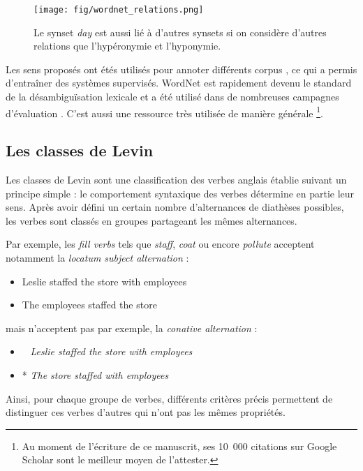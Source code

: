 \begin{figure}[t]
    \centering
    \texttt{[image: fig/wordnet\_relations.png]}
    \caption{\label{fig:wordnet_relations} Le synset \emph{day} est aussi lié à
        d'autres synsets si on considère d'autres relations que l'hypéronymie et
        l'hyponymie.}
\end{figure}

Les sens proposés ont étés utilisés pour annoter différents corpus
\citep{petrolito2014survey}, ce qui a permis d'entraîner des systèmes
supervisés. WordNet est rapidement devenu le standard de la désambiguïsation
lexicale et a été utilisé dans de nombreuses campagnes d'évaluation
\citep{navigli2009word}. C'est aussi une ressource très utilisée de manière
générale \footnote{Au moment de l'écriture de ce manuscrit, ses 10~000
    citations sur Google Scholar sont le meilleur moyen de l'attester.}.

\subsection{Les classes de Levin}

Les classes de Levin \citep{levin1993english} sont une classification des
verbes anglais établie suivant un principe simple : le comportement syntaxique
des verbes détermine en partie leur sens. Après avoir défini un certain nombre
d'alternances de diathèses possibles, les verbes sont classés en groupes
partageant les mêmes alternances.

Par exemple, les \emph{fill verbs} tels que \emph{staff}, \emph{coat} ou encore
\emph{pollute} acceptent notamment la \emph{locatum subject alternation} :

\begin{itemize}
    \item Leslie staffed the store with employees
    \item The employees staffed the store
\end{itemize}

mais n'acceptent pas par exemple, la \emph{conative alternation} :

\begin{itemize}
    \item ~ \emph{Leslie staffed the store with employees}
    \item * \emph{The store staffed with employees}
\end{itemize}

Ainsi, pour chaque groupe de verbes, différents critères précis permettent de
distinguer ces verbes d'autres qui n'ont pas les mêmes propriétés.

